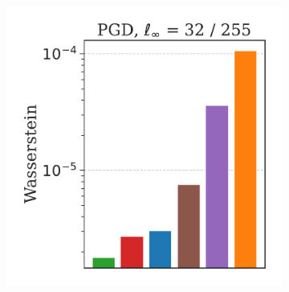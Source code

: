 \begin{figure}[H]
\begin{subfigure}[b]{0.23\textwidth}
        \centering
        \includegraphics[width=\textwidth]{img/results_discussion/adversarial/W_barplot_0.1255_300.pdf}
    \end{subfigure}

    \vspace{1em}


\end{figure}

